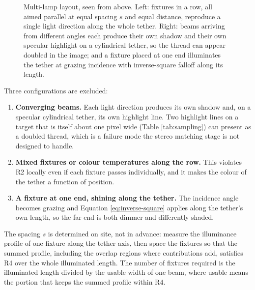 \begin{figure}[!ht]
\begin{tikzpicture}[>=Stealth, font=\small, scale=1.0]
\end{tikzpicture}
\caption[Correct and incorrect multi-lamp layouts]{Multi-lamp layout, seen from above. Left: fixtures in a row, all aimed parallel at equal spacing $s$ and equal distance, reproduce a single light direction along the whole tether. Right: beams arriving from different angles each produce their own shadow and their own specular highlight on a cylindrical tether, so the thread can appear doubled in the image; and a fixture placed at one end illuminates the tether at grazing incidence with inverse-square falloff along its length.}
\label{fig:multilamp}
\end{figure}

Three configurations are excluded:

\begin{enumerate}
    \item \textbf{Converging beams.} Each light direction produces its own shadow and, on a specular cylindrical tether, its own highlight line. Two highlight lines on a target that is itself about one pixel wide (Table \ref{tab:sampling}) can present as a doubled thread, which is a failure mode the stereo matching stage is not designed to handle.
    \item \textbf{Mixed fixtures or colour temperatures along the row.} This violates R2 locally even if each fixture passes individually, and it makes the colour of the tether a function of position.
    \item \textbf{A fixture at one end, shining along the tether.} The incidence angle becomes grazing and Equation \ref{eq:inverse-square} applies along the tether's own length, so the far end is both dimmer and differently shaded.
\end{enumerate}

The spacing $s$ is determined on site, not in advance: measure the illuminance profile of one fixture along the tether axis, then space the fixtures so that the summed profile, including the overlap regions where contributions add, satisfies R4 over the whole illuminated length. The number of fixtures required is the illuminated length divided by the usable width of one beam, where usable means the portion that keeps the summed profile within R4.


